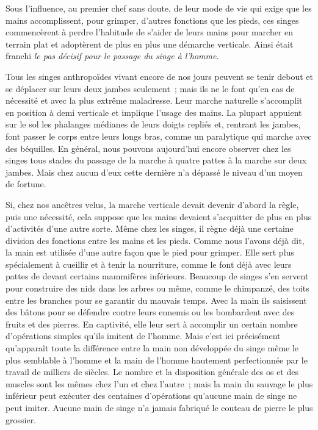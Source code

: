 \documentclass[french,twoside]{book} %
\begin{document}
Sous l’influence, au premier chef sans doute, de leur mode de vie qui exige que les mains accomplissent, pour grimper, d’autres fonctions que les pieds, ces singes commencèrent à perdre l’habitude de s’aider de leurs mains pour marcher en terrain plat et adoptèrent de plus en plus une démarche verticale. Ainsi était franchi \emph{le pas décisif pour le passage du singe à l’homme}.\par
Tous les singes anthropoïdes vivant encore de nos jours peuvent se tenir debout et se déplacer sur leurs deux jambes seulement ; mais ils ne le font qu’en cas de nécessité et avec la plus extrême maladresse. Leur marche naturelle s’accomplit en position à demi verticale et implique l’usage des mains. La plupart appuient sur le sol les phalanges médianes de leurs doigts repliés et, rentrant les jambes, font passer le corps entre leurs longs bras, comme un paralytique qui marche avec des béquilles. En général, nous pouvons aujourd’hui encore observer chez les singes tous stades du passage de la marche à quatre pattes à la marche sur deux jambes. Mais chez aucun d’eux cette dernière n’a dépassé le niveau d’un moyen de fortune.\par
Si, chez nos ancêtres velus, la marche verticale devait devenir d’abord la règle, puis une nécessité, cela suppose que les mains devaient s’acquitter de plus en plus d’activités d’une autre sorte. Même chez les singes, il règne déjà une certaine division des fonctions entre les mains et les pieds. Comme nous l’avons déjà dit, la main est utilisée d’une autre façon que le pied pour grimper. Elle sert plus spécialement à cueillir et à tenir la nourriture, comme le font déjà avec leurs pattes de devant certains mammifères inférieurs. Beaucoup de singes s’en servent pour construire des nids dans les arbres ou même, comme le chimpanzé, des toits entre les branches pour se garantir du mauvais temps. Avec la main ils saisissent des bâtons pour se défendre contre leurs ennemis ou les bombardent avec des fruits et des pierres. En captivité, elle leur sert à accomplir un certain nombre d’opérations simples qu’ils imitent de l’homme. Mais c’est ici précisément qu’apparaît toute la différence entre la main non développée du singe même le plus semblable à l’homme et la main de l’homme hautement perfectionnée par le travail de milliers de siècles. Le nombre et la disposition générale des os et des muscles sont les mêmes chez l’un et chez l’autre ; mais la main du sauvage le plus inférieur peut exécuter des centaines d’opérations qu’aucune main de singe ne peut imiter. Aucune main de singe n’a jamais fabriqué le couteau de pierre le plus grossier.\par
\end{document}
